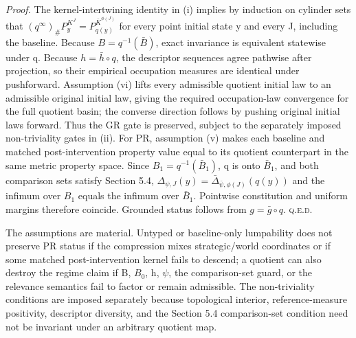 \documentclass[10pt]{article}
\newcommand{\push}{\mathord{\#}}
\begin{document}
\emph{Proof.} The kernel-intertwining identity in (i) implies by induction on cylinder sets that \((q^\infty)_{\push}P_y^{K^J}=P_{q(y)}^{\bar K^{\phi(J)}}\) for every point initial state y and every J, including the baseline. Because \(B=q^{-1}(\bar B)\), exact invariance is equivalent statewise under q. Because \(h=\bar h\circ q\), the descriptor sequences agree pathwise after projection, so their empirical occupation measures are identical under pushforward. Assumption (vi) lifts every admissible quotient initial law to an admissible original initial law, giving the required occupation-law convergence for the full quotient basin; the converse direction follows by pushing original initial laws forward. Thus the GR gate is preserved, subject to the separately imposed non-triviality gates in (ii). For PR, assumption (v) makes each baseline and matched post-intervention property value equal to its quotient counterpart in the same metric property space. Since \(B_1=q^{-1}(\bar B_1)\), q is onto \(\bar B_1\), and both comparison sets satisfy Section 5.4, \(\Delta_{\psi,J}(y)=\bar\Delta_{\bar\psi,\phi(J)}(q(y))\) and the infimum over \(B_1\) equals the infimum over \(\bar B_1\). Pointwise constitution and uniform margins therefore coincide. Grounded status follows from \(g=\bar g\circ q\). \hfill\textsc{q.e.d.}

The assumptions are material. Untyped or baseline-only lumpability does not preserve PR status if the compression mixes strategic/world coordinates or if some matched post-intervention kernel fails to descend; a quotient can also destroy the regime claim if B, \(B_0\), h, \(\psi\), the comparison-set guard, or the relevance semantics fail to factor or remain admissible. The non-triviality conditions are imposed separately because topological interior, reference-measure positivity, descriptor diversity, and the Section 5.4 comparison-set condition need not be invariant under an arbitrary quotient map.
\end{document}

